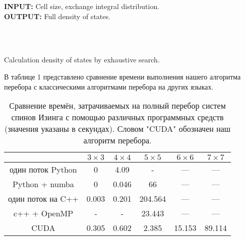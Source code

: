 \documentclass[utf8, babel, sor, jor, amsmath, amssymb, reprint]{elsarticle} %
\begin{document}
	\begin{algorithm}[H]
	\textbf{INPUT:} Cell size, exchange integral distribution.\\
	\textbf{OUTPUT:} Full density of states.
	\begin{algorithmic}
		{
			{
				{
					\ENDFOR\\
				}
				\ENDFOR\\
			}
			\ENDFOR
		}
		\ENDFOR
	\end{algorithmic}
	\caption{Calculation density of states by exhaustive search.}
	\label{algo:dos_exhaustive}
	\end{algorithm}

	В таблице 1 представлено сравнение времени выполнения нашего алгоритма перебора с классическими алгоритмами перебора на других языках.

	\begin{table}[h]
    \begin{center}
        \label{Time_Table}
        \caption{Сравнение времён, затрачиваемых на полный перебор систем спинов Изинга с помощью различных программных средств (значения указаны в секундах). Словом "CUDA" обозначен наш алгоритм перебора.}
        \begin{tabular}{|c|c|c|c|c|c|}
            \hline
                  & $3 \times 3$ & $4 \times 4$ & $5 \times 5$ & $6 \times 6$ & $7 \times 7$  \\ \hline
один поток Python & 0            & 4.09         & -            & ---          & ---           \\ \hline
Python + numba    & 0            & 0.046        & 66           & ---          & ---           \\ \hline
один поток на C++ & 0.003        & 0.201        & 204.564      & ---          & ---           \\ \hline
c++ + OpenMP      & -            & -            & 23.443       & ---          & ---           \\ \hline
CUDA              & 0.305        & 0.602        & 2.385        & 15.153       & 89.114        \\ \hline
        \end{tabular}
    \end{center}
\end{table}
\end{document}

